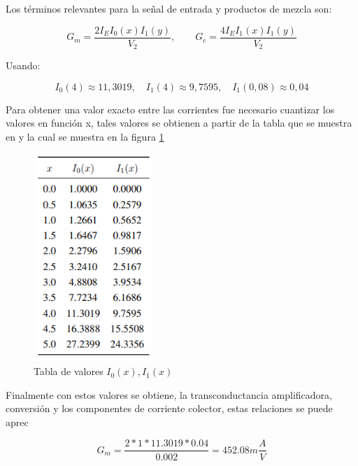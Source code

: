 \documentclass[conference]{IEEEtran}
\begin{document}
	Los términos relevantes para la señal de entrada y productos de mezcla son:
	
	\begin{equation}
		G_{m} = \frac{2I_{E}I_{0}(x)I_{1}(y)}{V_{2}}, \qquad G_{c} = \frac{4I_{E}I_{1}(x)I_{1}(y)}{V_{2}}
	\end{equation}
	
	Usando:
	
	\begin{equation}
		I_{0}(4) \approx 11,3019, \quad I_{1}(4) \approx 9,7595, \quad I_{1}(0,08) \approx 0,04
	\end{equation}
	
	Para obtener una valor exacto entre las corrientes fue necesario cuantizar los valores en función x, tales valores se obtienen a partir de la tabla que se muestra en \cite{pozar2011mixers} y la cual se muestra en la figura \ref{fig:valores-corriente}
	
	\begin{figure}[h]
		\centering
		\includegraphics[width=0.4\textwidth]{media/valores-corriente}
		\caption{Tabla de valores $I_0(x), I_1(x)$}
		\label{fig:valores-corriente}
	\end{figure}
	
	Finalmente con estos valores se obtiene, la transconductancia amplificadora, conversión y los componentes de corriente colector, estas relaciones se puede aprec
	
	
	
	\begin{equation}
		G_m = \frac{2*1*11.3019*0.04}{0.002} = 452.08m\frac{A}{V}
	\end{equation}
	
\end{document}
